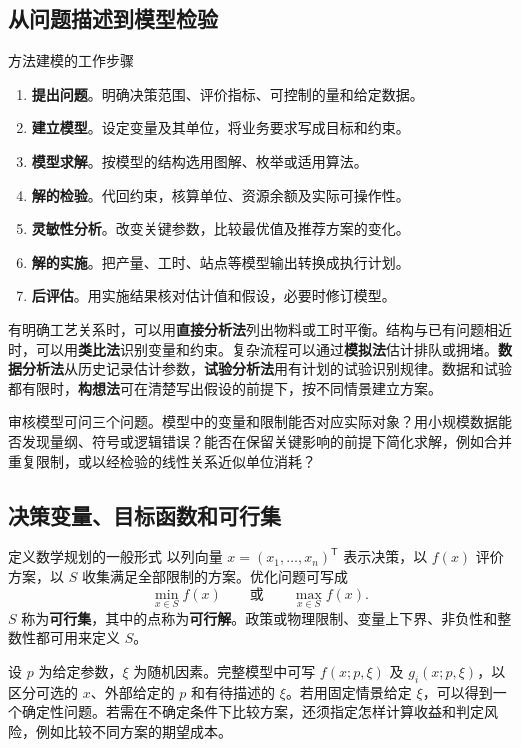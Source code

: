 \documentclass[UTF8,fontset=none,zihao=-4,a4paper]{ctexart}
\newcommand{\term}[1]{\textbf{#1}}
\newcommand{\transpose}{^{\mathsf T}}
\begin{document}
\subsection{从问题描述到模型检验}
\begin{infobox}{方法\quad 建模的工作步骤}
\begin{enumerate}[label=\arabic*.,leftmargin=2em]
\item \term{提出问题}。明确决策范围、评价指标、可控制的量和给定数据。
\item \term{建立模型}。设定变量及其单位，将业务要求写成目标和约束。
\item \term{模型求解}。按模型的结构选用图解、枚举或适用算法。
\item \term{解的检验}。代回约束，核算单位、资源余额及实际可操作性。
\item \term{灵敏性分析}。改变关键参数，比较最优值及推荐方案的变化。
\item \term{解的实施}。把产量、工时、站点等模型输出转换成执行计划。
\item \term{后评估}。用实施结果核对估计值和假设，必要时修订模型。
\end{enumerate}
\end{infobox}

有明确工艺关系时，可以用\term{直接分析法}列出物料或工时平衡。结构与已有问题相近时，可以用\term{类比法}识别变量和约束。复杂流程可以通过\term{模拟法}估计排队或拥堵。\term{数据分析法}从历史记录估计参数，\term{试验分析法}用有计划的试验识别规律。数据和试验都有限时，\term{构想法}可在清楚写出假设的前提下，按不同情景建立方案。

审核模型可问三个问题。模型中的变量和限制能否对应实际对象？用小规模数据能否发现量纲、符号或逻辑错误？能否在保留关键影响的前提下简化求解，例如合并重复限制，或以经检验的线性关系近似单位消耗？

\subsection{决策变量、目标函数和可行集}
\begin{infobox}{定义\quad 数学规划的一般形式}
以列向量 $x=(x_1,\ldots,x_n)\transpose$ 表示决策，以 $f(x)$ 评价方案，以 $S$ 收集满足全部限制的方案。优化问题可写成
\[
  \min_{x\in S} f(x)\qquad\text{或}\qquad \max_{x\in S} f(x).
\]
$S$ 称为\term{可行集}，其中的点称为\term{可行解}。政策或物理限制、变量上下界、非负性和整数性都可用来定义 $S$。
\end{infobox}

设 $p$ 为给定参数，$\xi$ 为随机因素。完整模型中可写 $f(x;p,\xi)$ 及 $g_i(x;p,\xi)$，以区分可选的 $x$、外部给定的 $p$ 和有待描述的 $\xi$。若用固定情景给定 $\xi$，可以得到一个确定性问题。若需在不确定条件下比较方案，还须指定怎样计算收益和判定风险，例如比较不同方案的期望成本。
\end{document}
